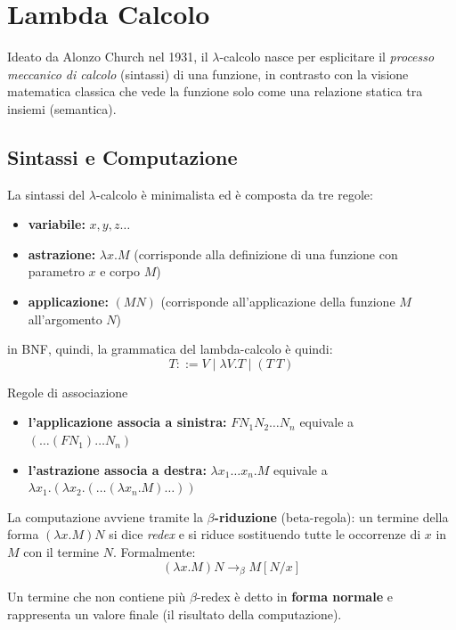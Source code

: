\chapter{Lambda Calcolo}
Ideato da Alonzo Church nel 1931, il $\lambda$-calcolo nasce per esplicitare il \textit{processo meccanico di calcolo} (sintassi) di una funzione, in contrasto con la visione matematica classica che vede la funzione solo come una relazione statica tra insiemi (semantica).

\section{Sintassi e Computazione}
La sintassi del $\lambda$-calcolo è minimalista ed è composta da tre regole:
\begin{itemize}
    \item \textbf{variabile:} $x, y, z \dots$
    \item \textbf{astrazione:} $\lambda x. M$ (corrisponde alla definizione di una funzione con parametro $x$ e corpo $M$)
    \item \textbf{applicazione:} $(M N)$ (corrisponde all'applicazione della funzione $M$ all'argomento $N$)
\end{itemize}
\vspace{0.5em}
in BNF, quindi, la grammatica del lambda-calcolo è quindi:
$$T ::= V \mid \lambda V.T \mid (T \ T)$$

\begin{gframe}{Regole di associazione}
    \begin{itemize}
        \item \textbf{l'applicazione associa a sinistra:} $F N_1 N_2 \dots N_n$ equivale a $(\dots (F N_1) \dots N_n)$
        \item \textbf{l'astrazione associa a destra:} $\lambda x_1 \dots x_n. M$ equivale a $\lambda x_1. (\lambda x_2. (\dots (\lambda x_n. M)\dots))$
    \end{itemize}
\end{gframe}

La computazione avviene tramite la \textbf{$\beta$-riduzione} (beta-regola): un termine della forma $(\lambda x.M) N$ si dice \textit{redex} e si riduce sostituendo tutte le occorrenze di $x$ in $M$ con il termine $N$.
Formalmente:
$$(\lambda x.M) N \rightarrow_\beta M[N/x]$$

Un termine che non contiene più $\beta$-redex è detto in \textbf{forma normale} e rappresenta un valore finale (il risultato della computazione).

